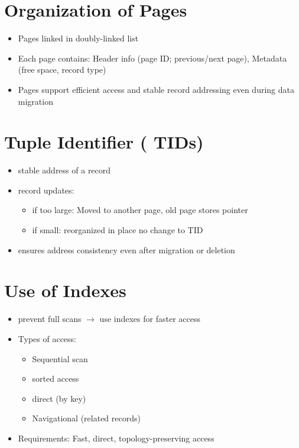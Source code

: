 \section{Organization of Pages}
\begin{itemize}
	\item Pages linked in doubly-linked list
	\item Each page contains: Header info (page ID; previous/next page), Metadata (free space, record type)
	\item Pages support efficient access and stable record addressing even during data migration
\end{itemize}

\section{Tuple Identifier ( TIDs)}
\begin{itemize}
	\item stable address of a record
	\item record updates: 
	\begin{itemize}
		\item if too large: Moved to another page, old page stores pointer
		\item if small: reorganized in place no change to TID
	\end{itemize}
	\item ensures address consistency even after migration or deletion
\end{itemize}

\section{Use of Indexes}
\begin{itemize}
	\item prevent full scans $\rightarrow$ use indexes for faster access
	\item Types of access: 
	\begin{itemize}
		\item Sequential scan
		\item sorted access
		\item direct (by key)
		\item Navigational (related records)
	\end{itemize}
	\item Requirements: Fast, direct, topology-preserving access	
\end{itemize}

